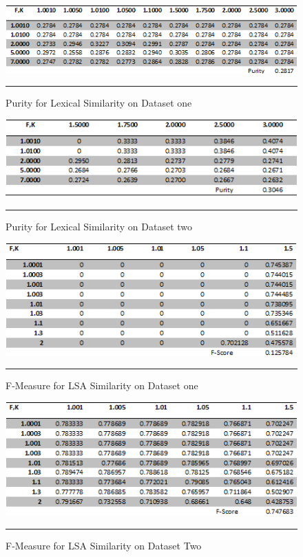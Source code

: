 \begin{figure}[htbp]
	\centering
		\includegraphics{./Figures/lexical_Purity_DS1.png}
		\rule{35em}{0.5pt}
	\caption[Purity for Lexical Similarity on Dataset one]{Purity for Lexical Similarity on Dataset one}
	\label{fig:purity3}
\end{figure}

\begin{figure}[htbp]
	\centering
		\includegraphics{./Figures/lexical_Purity_DS2.png}
		\rule{35em}{0.5pt}
	\caption[Purity for Lexical Similarity on Dataset two]{Purity for Lexical Similarity on Dataset two}
	\label{fig:F1}
\end{figure}

\begin{figure}[htbp]
	\centering
		\includegraphics{./Figures/lsa_F_DS1.png}
		\rule{35em}{0.5pt}
	\caption[F-Measure for LSA Similarity on Dataset one]{F-Measure for LSA Similarity on Dataset one}
	\label{fig:F2}
\end{figure}

\begin{figure}[htbp]
	\centering
		\includegraphics{./Figures/lsa_F_DS2.png}
		\rule{35em}{0.5pt}
	\caption[F-Measure for LSA Similarity on Dataset Two]{F-Measure for LSA Similarity on Dataset Two}
	\label{fig:F3}
\end{figure}

